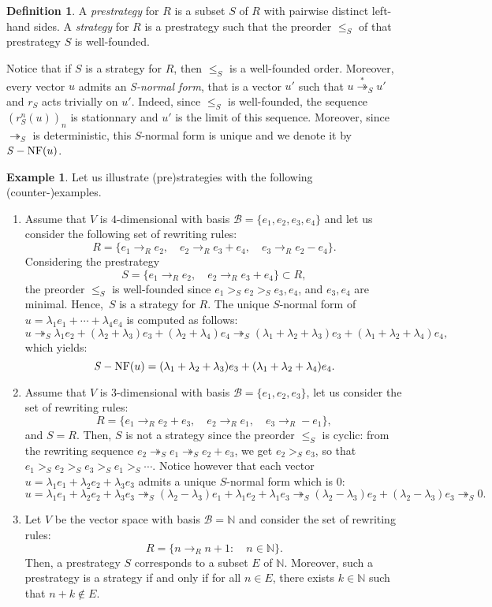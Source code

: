 \documentclass[11pt]{article}
\theoremstyle{definition}
\newtheorem{definition}[theorem]{Definition}
\newtheorem{example}[theorem]{Example}
\newcommand\basis{\mathscr{B}}
\newcommand\ordS{\leq_S}
\newcommand\N{\mathbb{N}}
\newcommand\rewR{\to_R}
\newcommand\parS{\twoheadrightarrow_S}
\newcommand\transS{\overset{*}{\twoheadrightarrow}_S}
\DeclareMathOperator{\SNF}{{\it S}-NF}
\begin{document}
\begin{definition}\label{def:strategies}
  A {\em prestrategy} for $R$ is a subset $S$ of $R$ with pairwise
  distinct left-hand sides. A {\em strategy} for $R$ is a prestrategy
  such that the preorder $\ordS$ of that prestrategy $S$ is well-founded. 
\end{definition}
\smallskip

Notice that if $S$ is a strategy for $R$, then $\ordS$ is a well-founded
order. Moreover, every vector $u$ admits an {\em S-normal form}, that is
a vector $u'$ such that $u\transS u'$ and $r_S$ acts trivially on $u'$.
Indeed, since $\ordS$ is well-founded, the sequence $(r_S^n(u))_n$ is
stationnary and $u'$ is the limit of this sequence. Moreover, since
$\parS$ is deterministic, this $S$-normal form is unique and we denote it
by~$\SNF(u)$. 
\smallskip

\begin{example}\label{ex:strategies_step_1}
  Let us illustrate (pre)strategies with the following
  (counter-)examples.
  \begin{enumerate}
  \item\label{it:ex_strat_1} Assume that $V$ is $4$-dimensional with
    basis $\basis=\{e_1,e_2,e_3,e_4\}$ and let us consider the following
    set of rewriting rules:
    \[R=\{e_1\rewR e_2,\quad e_2\rewR e_3+e_4,\quad e_3\rewR e_2-e_4\}.\]
    Considering the prestrategy
    \[S=\{e_1\rewR e_2,\quad e_2\rewR e_3+e_4\}\subset R,\]
    the preorder $\ordS$ is well-founded since $e_1>_Se_2>_Se_3,e_4$, and
    $e_3,e_4$ are minimal. Hence,~$S$ is a strategy for $R$. The unique
    $S$-normal form of $u=\lambda_1e_1+\cdots+\lambda_4e_4$ is computed
    as follows:
    \[u\parS\lambda_1e_2+(\lambda_2+\lambda_3)e_3+
    (\lambda_2+\lambda_4)e_4\parS(\lambda_1+\lambda_2+\lambda_3)e_3+
    (\lambda_1+\lambda_2+\lambda_4)e_4,\]
    which yields:
    \[\SNF(u)=(\lambda_1+\lambda_2+\lambda_3)e_3+
    (\lambda_1+\lambda_2+\lambda_4)e_4.\]
  \item\label{it:c-ex_strat_1} Assume that $V$ is $3$-dimensional with
    basis $\basis=\{e_1,e_2,e_3\}$, let us consider the set of rewriting
    rules:
    \[R=\{e_1\rewR e_2+e_3,\quad e_2\rewR e_1,\quad e_3\rewR -e_1\},\]
    and $S=R$. Then, $S$ is not a strategy since the preorder $\ordS$ is
    cyclic: from the rewriting sequence $e_2\parS e_1\parS e_2+e_3$, we
    get $e_2>_Se_3$, so that $e_1>_S e_2>_S e_3>_S e_1>_S\cdots$. Notice
    however that each vector $u=\lambda_1e_1+\lambda_2e_2+\lambda_3e_3$
    admits a unique $S$-normal form which is $0$:
    \[u=\lambda_1e_1+\lambda_2e_2+\lambda_3e_3\parS(\lambda_2-\lambda_3)
    e_1+\lambda_1e_2+\lambda_1e_3\parS(\lambda_2-\lambda_3)e_2+(\lambda_2-
    \lambda_3)e_3\parS 0.
    \]
  \item\label{it:case_N} Let $V$ be the vector space with basis
    $\basis= \mathbb N$ and consider the set of rewriting rules:
    \[R=\{n\rewR n+1:\quad n\in\N\}.\]
    Then, a prestrategy $S$ corresponds to a subset $E$ of $\mathbb N$.
    Moreover, such a prestrategy is a strategy if and only if for all
    $n\in E$, there exists $k\in \mathbb N$ such that $n + k \notin E$. 
  \end{enumerate}
\end{example}
\smallskip
\end{document}

